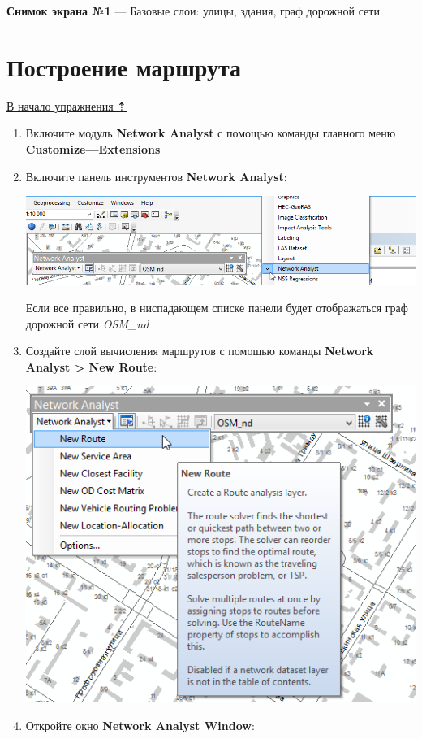 \documentclass[]{book}
\theoremstyle{definition}
\theoremstyle{definition}
\theoremstyle{definition}
\theoremstyle{remark}
\begin{document}
\textbf{Снимок экрана №1} --- Базовые слои: улицы, здания, граф дорожной
сети

\hypertarget{network-analysis-route}{%
\section{Построение маршрута}\label{network-analysis-route}}

\protect\hyperlink{network-analysis}{В начало упражнения ⇡}

\begin{enumerate}
\def\labelenumi{\arabic{enumi}.}
\item
  Включите модуль \textbf{Network Analyst} с помощью команды главного
  меню \textbf{Customize---Extensions}
\item
  Включите панель инструментов \textbf{Network Analyst}:

  \includegraphics{images/Ex12/image7.png}

  Если все правильно, в ниспадающем списке панели будет отображаться
  граф дорожной сети \emph{OSM\_nd}
\item
  Создайте слой вычисления маршрутов с помощью команды \textbf{Network
  Analyst \textgreater{} New Route}:

  \includegraphics{images/Ex12/image8.png}
\item
  Откройте окно \textbf{Network Analyst Window}:


\end{enumerate}
\end{document}
